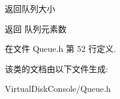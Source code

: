 返回队列大小 

\begin{DoxyReturn}{返回}
队列元素数 
\end{DoxyReturn}


在文件 Queue.\-h 第 52 行定义.



该类的文档由以下文件生成\-:\begin{DoxyCompactItemize}
\item 
Virtual\-Disk\-Console/Queue.\-h\end{DoxyCompactItemize}
